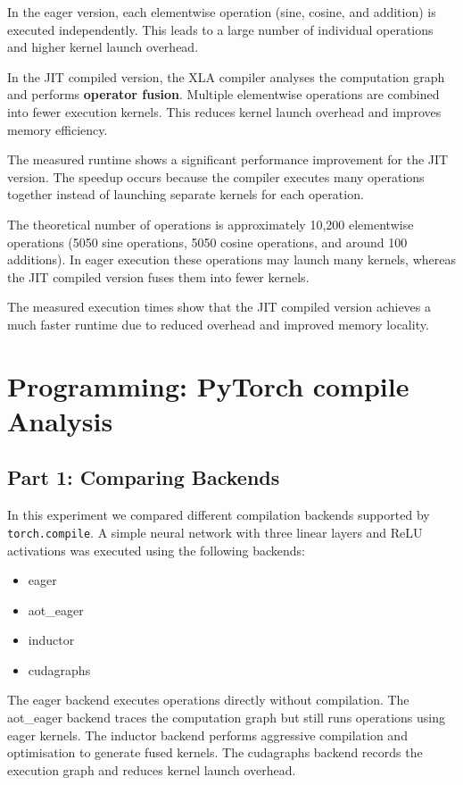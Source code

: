 \documentclass{article}
\begin{document}
In the eager version, each elementwise operation (sine, cosine, and addition) is executed independently. This leads to a large number of individual operations and higher kernel launch overhead.

In the JIT compiled version, the XLA compiler analyses the computation graph and performs \textbf{operator fusion}. Multiple elementwise operations are combined into fewer execution kernels. This reduces kernel launch overhead and improves memory efficiency.

The measured runtime shows a significant performance improvement for the JIT version. The speedup occurs because the compiler executes many operations together instead of launching separate kernels for each operation.

The theoretical number of operations is approximately 10,200 elementwise operations (5050 sine operations, 5050 cosine operations, and around 100 additions). In eager execution these operations may launch many kernels, whereas the JIT compiled version fuses them into fewer kernels.

The measured execution times show that the JIT compiled version achieves a much faster runtime due to reduced overhead and improved memory locality.

\section{Programming: PyTorch compile Analysis}
\subsection{Part 1: Comparing Backends}

In this experiment we compared different compilation backends supported by \texttt{torch.compile}. A simple neural network with three linear layers and ReLU activations was executed using the following backends:

\begin{itemize}
\item eager
\item aot\_eager
\item inductor
\item cudagraphs
\end{itemize}

The eager backend executes operations directly without compilation. The aot\_eager backend traces the computation graph but still runs operations using eager kernels. The inductor backend performs aggressive compilation and optimisation to generate fused kernels. The cudagraphs backend records the execution graph and reduces kernel launch overhead.
\end{document}
